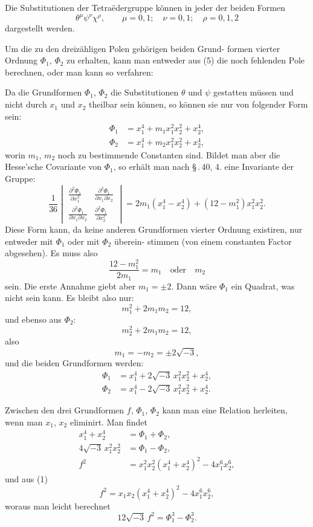 \documentclass[12pt,a4paper]{article}
\theoremstyle{plain}
\theoremstyle{definition}
\theoremstyle{remark}
\begin{document}
Die Substitutionen der Tetra\"edergruppe k\"onnen in jeder der
beiden Formen
\[
\theta^\mu \psi^\nu \chi^\rho,\qquad \mu = 0, 1;\quad \nu = 0, 1;\quad \rho = 0, 1, 2
\]
dargestellt werden.

Um die zu den dreiz\"ahligen Polen geh\"origen beiden Grund-
formen vierter Ordnung $\Phi_1$, $\Phi_2$ zu erhalten, kann man entweder
aus (5) die noch fehlenden Pole berechnen, oder man kann so
verfahren:

Da die Grundformen $\Phi_1$, $\Phi_2$ die Substitutionen $\theta$ und $\psi$
gestatten m\"ussen und nicht durch $x_1$ und $x_2$ theilbar sein k\"onnen,
so k\"onnen sie nur von folgender Form sein:
\begin{align*}
\Phi_1 &= x_1^4 + m_1 x_1^2 x_2^2 + x_2^4,\\
\Phi_2 &= x_1^4 + m_2 x_1^2 x_2^2 + x_2^4,
\end{align*}
worin $m_1$, $m_2$ noch zu bestimmende Constanten sind. Bildet man
aber die Hesse'sche Covariante von $\Phi_1$, so erh\"alt man nach
\S\,.\,40, 4. eine Invariante der Gruppe:
\[
\frac{1}{36}\begin{vmatrix}
\frac{\partial^2\Phi_1}{\partial x_1^2} & \frac{\partial^2\Phi_1}{\partial x_1\partial x_2}\\[6pt]
\frac{\partial^2\Phi_1}{\partial x_1\partial x_2} & \frac{\partial^2\Phi_1}{\partial x_2^2}
\end{vmatrix}
= 2m_1(x_1^4 - x_2^4) + (12 - m_1^2)x_1^2 x_2^2.
\]
Diese Form kann, da keine anderen Grundformen vierter
Ordnung existiren, nur entweder mit $\Phi_1$ oder mit $\Phi_2$ \"uberein-
stimmen (von einem constanten Factor abgesehen). Es muss also
\[
\frac{12 - m_1^2}{2m_1} = m_1\quad\text{oder}\quad m_2
\]
sein. Die erste Annahme giebt aber $m_1 = \pm 2$. Dann w\"are $\Phi_1$
ein Quadrat, was nicht sein kann. Es bleibt also nur:
\[
m_1^2 + 2m_1 m_2 = 12,
\]
und ebenso aus $\Phi_2$:
\[
m_2^2 + 2m_1 m_2 = 12,
\]
also
\[
m_1 = -m_2 = \pm 2\sqrt{-3},
\]
und die beiden Grundformen werden:
\begin{align*}
\Phi_1 &= x_1^4 + 2\sqrt{-3}\,x_1^2 x_2^2 + x_2^4,\\
\Phi_2 &= x_1^4 - 2\sqrt{-3}\,x_1^2 x_2^2 + x_2^4.
\end{align*}

Zwischen den drei Grundformen $f$, $\Phi_1$, $\Phi_2$ kann man eine
Relation herleiten, wenn man $x_1$, $x_2$ eliminirt. Man findet
\begin{equation}\label{eq:56_7}
\begin{aligned}
x_1^4 + x_2^4 &= \Phi_1 + \Phi_2,\\
4\sqrt{-3}\,x_1^2 x_2^2 &= \Phi_1 - \Phi_2,\\
f^2 &= x_1^2 x_2^2(x_1^4 + x_2^4)^2 - 4x_1^6 x_2^6,
\end{aligned}\tag{7}
\end{equation}
und aus (1)
\[
f^2 = x_1 x_2 (x_1^4 + x_2^4)^2 - 4x_1^6 x_2^6,
\]
woraus man leicht berechnet
\begin{equation}\label{eq:56_8}
12\sqrt{-3}\,f^2 = \Phi_1^3 - \Phi_2^3.\tag{8}
\end{equation}
\end{document}
